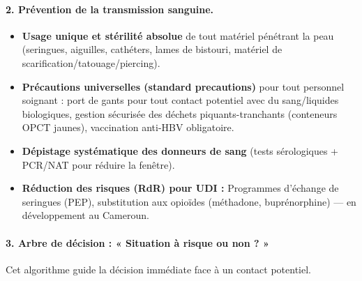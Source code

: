 \documentclass[11pt]{article}
\begin{document}
\paragraph{2. Prévention de la transmission sanguine.}
\begin{itemize}
    \item \textbf{Usage unique et stérilité absolue} de tout matériel pénétrant la peau (seringues, aiguilles, cathéters, lames de bistouri, matériel de scarification/tatouage/piercing).
    \item \textbf{Précautions universelles (standard precautions)} pour tout personnel soignant : port de gants pour tout contact potentiel avec du sang/liquides biologiques, gestion sécurisée des déchets piquants-tranchants (conteneurs OPCT jaunes), vaccination anti-HBV obligatoire.
    \item \textbf{Dépistage systématique des donneurs de sang} (tests sérologiques + PCR/NAT pour réduire la fenêtre).
    \item \textbf{Réduction des risques (RdR) pour UDI :} Programmes d'échange de seringues (PEP), substitution aux opioïdes (méthadone, buprénorphine) — en développement au Cameroun.
\end{itemize}

\paragraph{3. Arbre de décision : « Situation à risque ou non ? »}
Cet algorithme guide la décision immédiate face à un contact potentiel.
\end{document}
